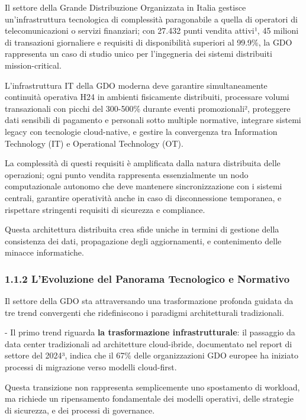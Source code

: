 \documentclass{report}
\begin{document}
Il settore della Grande Distribuzione Organizzata in Italia gestisce
un'infrastruttura tecnologica di complessità paragonabile a quella di
operatori di telecomunicazioni o servizi finanziari; con 27.432 punti
vendita attivi¹, 45 milioni di transazioni giornaliere e requisiti di
disponibilità superiori al 99.9\%, la GDO rappresenta un caso di studio
unico per l'ingegneria dei sistemi distribuiti mission-critical.

L'infrastruttura IT della GDO moderna deve garantire simultaneamente
continuità operativa H24 in ambienti fisicamente distribuiti, processare
volumi transazionali con picchi del 300-500\% durante eventi
promozionali², proteggere dati sensibili di pagamento e personali sotto
multiple normative, integrare sistemi legacy con tecnologie
cloud-native, e gestire la convergenza tra Information Technology (IT) e
Operational Technology (OT).

La complessità di questi requisiti è amplificata dalla natura
distribuita delle operazioni; ogni punto vendita rappresenta
essenzialmente un nodo computazionale autonomo che deve mantenere
sincronizzazione con i sistemi centrali, garantire operatività anche in
caso di disconnessione temporanea, e rispettare stringenti requisiti di
sicurezza e compliance.

Questa architettura distribuita crea sfide uniche in termini di gestione
della consistenza dei dati, propagazione degli aggiornamenti, e
contenimento delle minacce informatiche.

\subsubsection{\texorpdfstring{\textbf{1.1.2 L'Evoluzione del Panorama
Tecnologico e
Normativo}}{1.1.2 L'Evoluzione del Panorama Tecnologico e Normativo}}\label{levoluzione-del-panorama-tecnologico-e-normativo}

Il settore della GDO sta attraversando una trasformazione profonda
guidata da tre trend convergenti che ridefiniscono i paradigmi
architetturali tradizionali.

- Il primo trend riguarda \textbf{la trasformazione infrastrutturale}:
il passaggio da data center tradizionali ad architetture cloud-ibride,
documentato nel report di settore del 2024³, indica che il 67\% delle
organizzazioni GDO europee ha iniziato processi di migrazione verso
modelli cloud-first.

Questa transizione non rappresenta semplicemente uno spostamento di
workload, ma richiede un ripensamento fondamentale dei modelli
operativi, delle strategie di sicurezza, e dei processi di governance.
\end{document}

